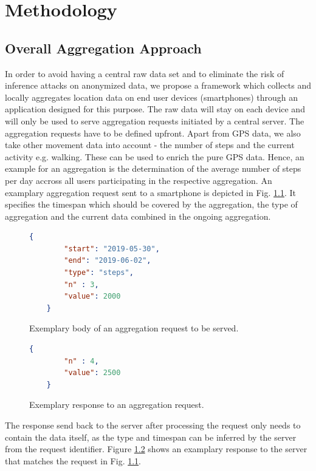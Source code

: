 \chapter{Methodology}\label{chapter:method}
\section{Overall Aggregation Approach}
In order to avoid having a central raw data set and to eliminate the risk of inference attacks on anonymized data, we propose a framework which collects and locally aggregates location data on end user devices (smartphones) through an application designed for this purpose. The raw data will stay on each device and will only be used to serve aggregation requests initiated by a central server. The aggregation requests have to be defined upfront. Apart from GPS data, we also take other movement data into account - the number of steps and the current activity e.g. walking. These can be used to enrich the pure GPS data. Hence, an example for an aggregation is the determination of the average number of steps per day accross all users participating in the respective aggregation. An examplary aggregation request sent to a smartphone is depicted in Fig. \ref{incoming-aggregation-request}. It specifies the timespan which should be covered by the aggregation, the type of aggregation and the current data combined in the ongoing aggregation.

\begin{figure}[h!]
	\begin{lstlisting}[language=json,firstnumber=1]
	{
		"start": "2019-05-30",
		"end": "2019-06-02",
		"type": "steps",
		"n" : 3,
		"value": 2000
	}
	\end{lstlisting}
	\caption{Exemplary body of an aggregation request to be served.}
	\label{incoming-aggregation-request}
\end{figure}

\begin{figure}[h!]
	\begin{lstlisting}[language=json,firstnumber=1]
	{
		"n" : 4,
		"value": 2500
	}
	\end{lstlisting}
	\caption{Exemplary response to an aggregation request.}
	\label{outgoing-aggregation-response}
\end{figure}

The response send back to the server after processing the request only needs to contain the data itself, as the type and timespan can be inferred by the server from the request identifier. Figure \ref{outgoing-aggregation-response} shows an examplary response to the server that matches the request in Fig. \ref{incoming-aggregation-request}.


